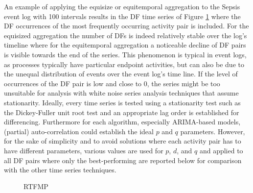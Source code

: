 An example of applying the equisize or equitemporal aggregation to the Sepsis event log with 100 intervals results in the DF time series of Figure \ref{fig:sepsists} where the DF occurrences of the most frequently occurring activity pair is included.
For the equisized aggregation the number of DFs is indeed relatively stable over the log's timeline where for the equitemporal aggregation a noticeable decline of DF pairs is visible towards the end of the series.
This phenomenon is typical in event logs, as processes typically have particular endpoint activities, but can also be due to the unequal distribution of events over the event log's time line.
If the level of occurrences of the DF pair is low and close to 0, the series might be too unsuitable for analysis with white noise series analysis techniques that assume stationarity.
Ideally, every time series is tested using a stationarity test such as the Dickey-Fuller unit root test \cite{leybourne1995testing} and an appropriate lag order is established for differencing. 
Furthermore for each algorithm, especially ARIMA-based models, (partial) auto-correlation could establish the ideal $p$ and $q$ parameters.
However, for the sake of simplicity and to avoid solutions where each activity pair has to have different parameters, various values are used for $p$, $d$, and $q$ and applied to all DF pairs where only the best-performing are reported below for comparison with the other time series techniques.
\begin{figure}[tb]
	\centering
	\caption{RTFMP}
	\label{fig:sepsists}
\end{figure}


